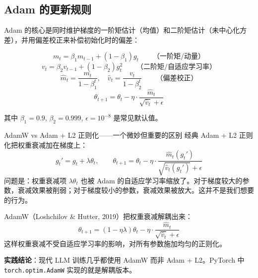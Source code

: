 \subsection{Adam 的更新规则}

Adam 的核心是同时维护梯度的一阶矩估计（均值）和二阶矩估计（未中心化方差），并用偏差校正来补偿初始化时的偏差：

$$
m_t = \beta_1 m_{t-1} + (1 - \beta_1) g_t \qquad \text{（一阶矩/动量）}
$$
$$
v_t = \beta_2 v_{t-1} + (1 - \beta_2) g_t^2 \qquad \text{（二阶矩/自适应学习率）}
$$
$$
\hat{m}_t = \frac{m_t}{1 - \beta_1^t}, \quad \hat{v}_t = \frac{v_t}{1 - \beta_2^t} \qquad \text{（偏差校正）}
$$
$$
\theta_{t+1} = \theta_t - \eta \cdot \frac{\hat{m}_t}{\sqrt{\hat{v}_t} + \epsilon}
$$

其中 $\beta_1 = 0.9$, $\beta_2 = 0.999$, $\epsilon = 10^{-8}$ 是常见默认值。

\begin{knowledgebox}{AdamW vs Adam + L2 正则化——一个微妙但重要的区别}
经典 Adam + L2 正则化把权重衰减加在梯度上：
$$
g_t' = g_t + \lambda \theta_t, \qquad \theta_{t+1} = \theta_t - \eta \cdot \frac{\hat{m}_t(g_t')}{\sqrt{\hat{v}_t(g_t')} + \epsilon}
$$
问题是：权重衰减项 $\lambda \theta_t$ 也被 Adam 的自适应学习率缩放了。对于梯度较大的参数，衰减效果被削弱；对于梯度较小的参数，衰减效果被放大。这并不是我们想要的行为。

AdamW（Loshchilov \& Hutter, 2019）把权重衰减解耦出来：
$$
\theta_{t+1} = (1 - \eta \lambda) \theta_t - \eta \cdot \frac{\hat{m}_t}{\sqrt{\hat{v}_t} + \epsilon}
$$
这样权重衰减不受自适应学习率的影响，对所有参数施加均匀的正则化。

\textbf{实践结论}：现代 LLM 训练几乎都使用 AdamW 而非 Adam + L2。PyTorch 中 \texttt{torch.optim.AdamW} 实现的就是解耦版本。
\end{knowledgebox}


